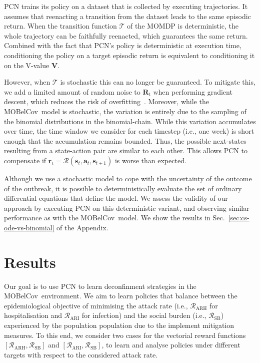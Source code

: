 \documentclass{article}
\renewcommand{\cite}[1]{\citep{#1}}
\newcommand{\mdptransition}{\mathcal{T}}
\newcommand{\mdprewardfn}{\mathcal{R}}
\newcommand{\momdprewardfn}{\bm{\mathcal{R}}}
\newcommand{\mdpstate}{\mathbf{s}}
\newcommand{\momdpreward}{\mathbf{r}}
\newcommand{\mdpaction}{\mathbf{a}}
\newcommand{\momdpname}{MOBelCov}
\begin{document}
PCN trains its policy on a dataset that is collected by executing trajectories. It assumes that reenacting a transition from the dataset leads to the same episodic return. When the transition function $\mathcal{T}$ of the MOMDP is deterministic, the whole trajectory can be faithfully reenacted, which guarantees the same return. Combined with the fact that PCN's policy is deterministic at execution time, conditioning the policy on a target episodic return is equivalent to conditioning it on the V-value $\mathbf{V}$.

However, when $\mdptransition$ is stochastic this can no longer be guaranteed. To mitigate this, we add a limited amount of random noise to $\mathbf{R}_t$ when performing gradient descent, which reduces the risk of overfitting~\cite{zur2009noise}. Moreover, while the \momdpname\ model is stochastic, the variation is entirely due to the sampling of the binomial distributions in the binomial-chain. While this variation accumulates over time, the time window we consider for each timestep (i.e., one week) is short enough that the accumulation remains bounded. Thus, the possible next-states resulting from a state-action pair are similar to each other. This allows PCN to compensate if $\momdpreward_t = \momdprewardfn(\mdpstate_t, \mdpaction_t, \mdpstate_{t+1})$ is worse than expected.

Although we use a stochastic model to cope with the uncertainty of the outcome of the outbreak, it is possible to deterministically evaluate the set of ordinary differential equations that define the model. We assess the validity of our approach by executing PCN on this deterministic variant, and observing similar performance as with the \momdpname\ model. We show the results in Sec.~\ref{sec:cs-ode-vs-binomial} of the Appendix.

\section{Results}
\label{sec:experiments}
Our goal is to use PCN to learn deconfinment strategies in the \momdpname\ environment. We aim to learn policies that balance between the epidemiological objective of minimising the attack rate (i.e., $\mdprewardfn_\text{ARH}$ for hospitalisation and $\mdprewardfn_\text{ARI}$ for infection) and the social burden (i.e., $\mdprewardfn_\text{SB}$) experienced by the population population due to the implement mitigation measures. To this end, we consider two cases for the vectorial reward functions $[\mdprewardfn_\text{ARH}, \mdprewardfn_\text{SB}]$ and $[\mdprewardfn_\text{ARI}, \mdprewardfn_\text{SB}]$, to learn and analyse policies under different targets with respect to the considered attack rate.
\end{document}
